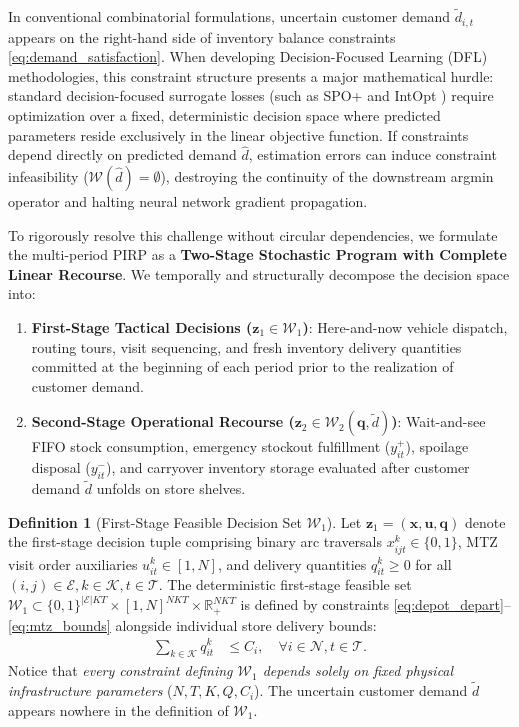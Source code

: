 \documentclass[11pt,a4paper]{article}
\theoremstyle{definition}
\newtheorem{definition}{Definition}
\theoremstyle{remark}
\begin{document}
In conventional combinatorial formulations, uncertain customer demand $\tilde{d}_{i,t}$ appears on the right-hand side of inventory balance constraints \eqref{eq:demand_satisfaction}. When developing Decision-Focused Learning (DFL) methodologies, this constraint structure presents a major mathematical hurdle: standard decision-focused surrogate losses (such as SPO+ \citep{elmachtoub2022smart} and IntOpt \citep{mandi2020interior}) require optimization over a fixed, deterministic decision space where predicted parameters reside exclusively in the linear objective function. If constraints depend directly on predicted demand $\hat{d}$, estimation errors can induce constraint infeasibility ($\mathcal{W}(\hat{d}) = \emptyset$), destroying the continuity of the downstream argmin operator and halting neural network gradient propagation.

To rigorously resolve this challenge without circular dependencies, we formulate the multi-period PIRP as a \textbf{Two-Stage Stochastic Program with Complete Linear Recourse}. We temporally and structurally decompose the decision space into:
\begin{enumerate}[label=(\roman*)]
    \item \textbf{First-Stage Tactical Decisions ($\mathbf{z}_1 \in \mathcal{W}_1$)}: Here-and-now vehicle dispatch, routing tours, visit sequencing, and fresh inventory delivery quantities committed at the beginning of each period prior to the realization of customer demand.
    \item \textbf{Second-Stage Operational Recourse ($\mathbf{z}_2 \in \mathcal{W}_2(\mathbf{q}, \tilde{d})$)}: Wait-and-see FIFO stock consumption, emergency stockout fulfillment ($y_{it}^+$), spoilage disposal ($y_{it}^-$), and carryover inventory storage evaluated after customer demand $\tilde{d}$ unfolds on store shelves.
\end{enumerate}

\begin{definition}[First-Stage Feasible Decision Set $\mathcal{W}_1$]
\label{def:w1_set}
Let $\mathbf{z}_1 = (\mathbf{x}, \mathbf{u}, \mathbf{q})$ denote the first-stage decision tuple comprising binary arc traversals $x_{ijt}^k \in \{0, 1\}$, MTZ visit order auxiliaries $u_{it}^k \in [1, N]$, and delivery quantities $q_{it}^k \ge 0$ for all $(i, j) \in \mathcal{E}, k \in \mathcal{K}, t \in \mathcal{T}$. The deterministic first-stage feasible set $\mathcal{W}_1 \subset \{0, 1\}^{|\mathcal{E}| K T} \times [1, N]^{N K T} \times \mathbb{R}_+^{N K T}$ is defined by constraints \eqref{eq:depot_depart}--\eqref{eq:mtz_bounds} alongside individual store delivery bounds:
\begin{align}
    \sum_{k \in \mathcal{K}} q_{it}^k &\le C_i, \quad \forall i \in \mathcal{N}, t \in \mathcal{T}. \label{eq:w1_store_cap}
\end{align}
Notice that \textit{every constraint defining $\mathcal{W}_1$ depends solely on fixed physical infrastructure parameters} ($N, T, K, Q, C_i$). The uncertain customer demand $\tilde{d}$ appears nowhere in the definition of $\mathcal{W}_1$.
\end{definition}
\end{document}
